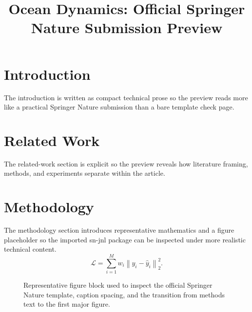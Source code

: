 \documentclass[pdflatex,sn-mathphys-num]{sn-jnl}
\begin{document}
\title[Article Title]{Ocean Dynamics: Official Springer Nature Submission Preview}
\author*[1]{ }
\author[2]{ }
\maketitle
\section{Introduction}
The introduction is written as compact technical prose so the preview reads more like a practical Springer Nature submission than a bare template check page.
\section{Related Work}
The related-work section is explicit so the preview reveals how literature framing, methods, and experiments separate within the article.
\section{Methodology}
The methodology section introduces representative mathematics and a figure placeholder so the imported sn-jnl package can be inspected under more realistic technical content.
\begin{equation}
\mathcal{L} = \sum_{i=1}^{M} w_i \left\| y_i - \hat{y}_i \right\|_2^2.
\end{equation}
\begin{figure}[t]
\centering
{}
\caption{Representative figure block used to inspect the official Springer Nature template, caption spacing, and the transition from methods text to the first major figure.}
\end{figure}
\end{document}
